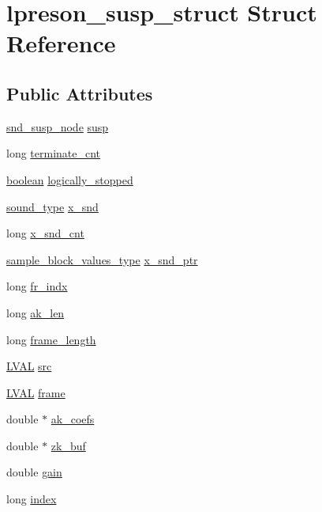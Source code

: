 \hypertarget{structlpreson__susp__struct}{}\section{lpreson\+\_\+susp\+\_\+struct Struct Reference}
\label{structlpreson__susp__struct}
\subsection*{Public Attributes}
\begin{DoxyCompactItemize}
\item 
\hyperlink{sound_8h_a6b268203688a934bd798ceb55f85d4c0}{snd\+\_\+susp\+\_\+node} \hyperlink{structlpreson__susp__struct_a9fa83fd496295a2ec531971508ad0f55}{susp}
\item 
long \hyperlink{structlpreson__susp__struct_aaadce34798755924d5fcabf6a86b236f}{terminate\+\_\+cnt}
\item 
\hyperlink{cext_8h_a7670a4e8a07d9ebb00411948b0bbf86d}{boolean} \hyperlink{structlpreson__susp__struct_a55246cc05bc58ee262d302fc8c729f4f}{logically\+\_\+stopped}
\item 
\hyperlink{sound_8h_a792cec4ed9d6d636d342d9365ba265ea}{sound\+\_\+type} \hyperlink{structlpreson__susp__struct_a6ceea729bec2304da39e80d905732fa2}{x\+\_\+snd}
\item 
long \hyperlink{structlpreson__susp__struct_a5a80949a81b546fb277a53ea7b407db2}{x\+\_\+snd\+\_\+cnt}
\item 
\hyperlink{sound_8h_a83d17f7b465d1591f27cd28fc5eb8a03}{sample\+\_\+block\+\_\+values\+\_\+type} \hyperlink{structlpreson__susp__struct_a55af26503932fc5a89fe5785e5638065}{x\+\_\+snd\+\_\+ptr}
\item 
long \hyperlink{structlpreson__susp__struct_a033be2728f4cdd98153901caf1a4bce5}{fr\+\_\+indx}
\item 
long \hyperlink{structlpreson__susp__struct_afbaf2328ef0b29e7b01eeb91d6505eb9}{ak\+\_\+len}
\item 
long \hyperlink{structlpreson__susp__struct_a5a810e2c2d60c71357a726f0137e2b9c}{frame\+\_\+length}
\item 
\hyperlink{xldmem_8h_a9a9ec6a5fbca2b40ed8d19faa799be8c}{L\+V\+AL} \hyperlink{structlpreson__susp__struct_a8d3297b262a40bff864dd88b061fbd41}{src}
\item 
\hyperlink{xldmem_8h_a9a9ec6a5fbca2b40ed8d19faa799be8c}{L\+V\+AL} \hyperlink{structlpreson__susp__struct_a3c376550ede2c830247345c6156a8cf4}{frame}
\item 
double $\ast$ \hyperlink{structlpreson__susp__struct_ac0903f4413dea4eaec92963cac02d4bf}{ak\+\_\+coefs}
\item 
double $\ast$ \hyperlink{structlpreson__susp__struct_ad19141e13fcfb6d01416846814776247}{zk\+\_\+buf}
\item 
double \hyperlink{structlpreson__susp__struct_aa469be8e66d11f7e56be9514caa10946}{gain}
\item 
long \hyperlink{structlpreson__susp__struct_a53a1ff0fec497ebbccde0f19f222078f}{index}
\end{DoxyCompactItemize}


